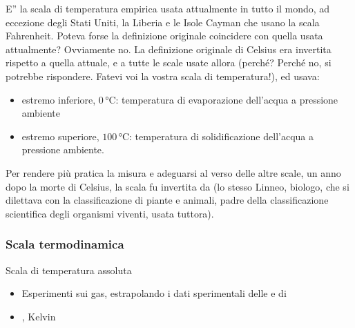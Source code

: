 \documentclass[letterpaper,10pt,italian]{jupyterBook}
\begin{document}
\sphinxAtStartPar
{} E” la scala di temperatura empirica usata attualmente in tutto il mondo, ad eccezione degli Stati Uniti, la Liberia e le Isole Cayman che usano la scala Fahrenheit. Poteva forse la definizione originale coincidere con quella usata attualmente? Ovviamente no. La definizione originale di Celsius era invertita rispetto a quella attuale, e a tutte le scale usate allora (perché? Perché no, si potrebbe rispondere. Fatevi voi la vostra scala di temperatura!), ed usava:
\begin{itemize}
\item {} 
\sphinxAtStartPar
estremo inferiore, \(0 \, \text{°C}\): temperatura di evaporazione dell’acqua a pressione ambiente

\item {} 
\sphinxAtStartPar
estremo superiore, \(100 \, \text{°C}\): temperatura di solidificazione dell’acqua a pressione ambiente.

\end{itemize}

\sphinxAtStartPar
Per rendere più pratica la misura e adeguarsi al verso delle altre scale, un anno dopo la morte di Celsius, la scala fu invertita da  (lo stesso Linneo, biologo, che si dilettava con la classificazione di piante e animali, padre della classificazione scientifica degli organismi viventi, usata tuttora).


\subsubsection{Scala termodinamica}
\label{\detokenize{ch/thermodynamics/foundation-experiments:scala-termodinamica}}
\sphinxAtStartPar
Scala di temperatura assoluta
\begin{itemize}
\item {} 
\sphinxAtStartPar
 Esperimenti sui gas, estrapolando i dati sperimentali delle {\hyperref[\detokenize{ch/thermodynamics/ideal-gas-experiments:physics-hs-thermodynamics-matter-gases-ideal-experiments-charles}]{}} e di {\hyperref[\detokenize{ch/thermodynamics/ideal-gas-experiments:physics-hs-thermodynamics-matter-gases-ideal-experiments-gay-lussac}]{}}

\item {} 
, Kelvin 

\end{itemize}
\end{document}
